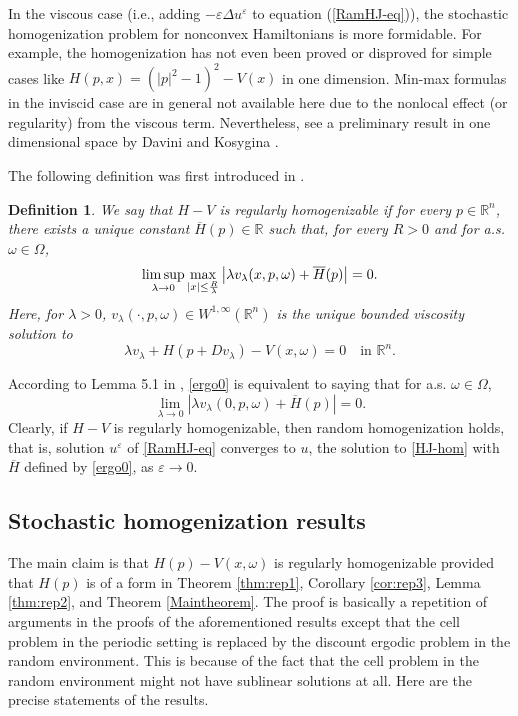 \documentclass[12pt,reqno]{amsart}
\theoremstyle{plain}
\newtheorem{defn}{Definition}
\theoremstyle{remark}
\numberwithin{equation}{section}
\newcommand{\R}{\mathbb{R}}
\newcommand{\ep}{\varepsilon}
\newcommand{\lam}{\lambda}
\newcommand{\om}{\omega}
\newcommand{\ol}{\overline}
\begin{document}
\smallskip

In the viscous case (i.e., adding $-\ep \Delta u^{\ep}$ to equation (\ref{RamHJ-eq})), the stochastic homogenization problem for nonconvex Hamiltonians is more formidable.  For example, the homogenization has not even been proved or disproved for  simple cases like $H(p,x)=(|p|^2-1)^2-V(x)$ in one dimension.  Min-max formulas in the inviscid case are in general not available here due to the nonlocal effect (or regularity)  from the viscous term.  Nevertheless, see  a preliminary result in one dimensional space by Davini and Kosygina \cite{DaKo}.


\smallskip

The following definition was first introduced in  \cite{ATY2}.
\begin{defn}\label{regularhomo}  
We say that $H-V$  is regularly homogenizable if  for every  $p\in  \R^n$,  there exists a unique constant $\overline H(p)\in   \R$ such that,
for every $R>0$ and for a.s. $\omega\in \Omega$,
\begin{equation}\label{ergo0}
\limsup_{\lambda\to 0}\max_{|x|\leq {R\over \lambda}}\left|\lambda v_{\lambda}(x, p, \omega)+\overline H(p)\right|=0.
\end{equation}
Here, for $\lam>0$,  $ v_{\lambda}(\cdot, p, \omega)\in W^{1,\infty}(\R^n)$ is the unique bounded viscosity solution to
$$
\lambda v_{\lambda}+H(p+Dv_{\lambda})-V(x, \omega)=0   \quad \text{in $\R^n$}.
$$
\end{defn}


According to Lemma 5.1 in  \cite{AS3},  \eqref{ergo0}  is equivalent to saying that for a.s. $\omega\in \Omega$,
$$
\lim_{\lambda\to 0}\left|\lambda v_{\lambda}(0, p, \omega)+\overline H(p)\right|=0.
$$
Clearly,  if $H-V$ is regularly homogenizable,  then random homogenization holds,
that is,  solution $u^{\ep}$ of \eqref{RamHJ-eq} converges to $u$, the solution to \eqref{HJ-hom} with $\ol{H}$ defined by \eqref{ergo0}, as $\ep \to 0$. 


\subsection{Stochastic homogenization results}\label{sec:stoc-main}
The main claim is that $H(p)-V(x,\om)$ is regularly homogenizable provided that $H(p)$ is of a form in Theorem \ref{thm:rep1}, Corollary \ref{cor:rep3},
 Lemma \ref{thm:rep2}, and Theorem \ref{Maintheorem}. The proof is basically a repetition of arguments in the proofs of the aforementioned results 
except that the cell problem in the periodic setting is replaced by the discount ergodic problem in the random environment.   
This is because of the fact that the cell problem in the random environment might not have sublinear solutions at all.
Here are the precise statements of the results.
\end{document}
